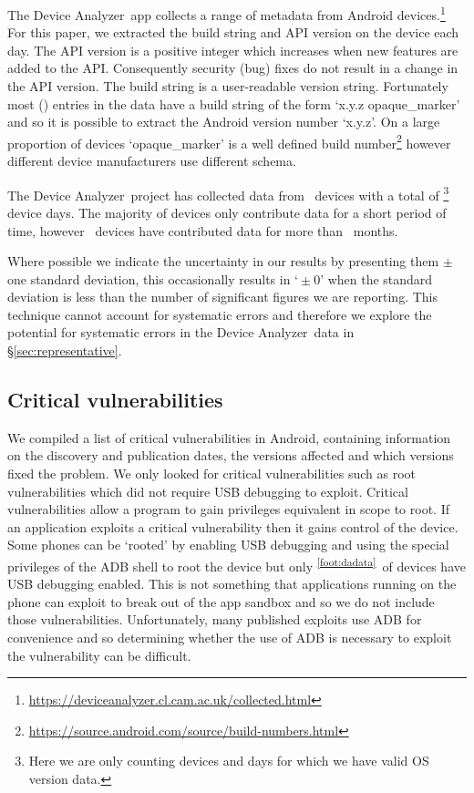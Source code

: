 \documentclass[conference,a4paper,twoside]{IEEEtran}
\newcommand{\da}{Device Analyzer}
\newcommand{\dafoot}{\textsuperscript{\ref{foot:dadata}}}
\newcommand{\daNumDevices}{\daNumOSDevices}
\newcommand{\daDeviceDays}{\daOSTotalDaysData}
\begin{document}
The \da\ app collects a range of metadata from Android devices.\footnote{\url{https://deviceanalyzer.cl.cam.ac.uk/collected.html}}
For this paper, we extracted the build string and API version on the device each day.
The API version is a positive integer which increases when new features are added to the API.
Consequently security (bug) fixes do not result in a change in the API version.
The build string is a user-readable version string.
Fortunately most (\daOSVersionPercValidLines) entries in the data have a build string of the form `x.y.z opaque\_marker' and so it is possible to extract the Android version number `x.y.z'.
On a large proportion of devices `opaque\_marker' is a well defined build number\footnote{\url{https://source.android.com/source/build-numbers.html}} however different device manufacturers use different schema.

The \da\ project has collected data from \daNumDevices\ devices with a total of \daDeviceDays\footnote{Here we are only counting devices and days for which we have valid OS version data.} device days. The majority of devices only contribute data for a short period of time, however \daMonthsDevices\ devices have contributed data for more than \daMonths~months.

Where possible we indicate the uncertainty in our results by presenting them $\pm$ one standard deviation, this occasionally results in `${} \pm 0$' when the standard deviation is less than the number of significant figures we are reporting.
This technique cannot account for systematic errors and therefore we explore the potential for systematic errors in the \da\ data in \S\ref{sec:representative}.



\subsection{Critical vulnerabilities}

We compiled a list of critical vulnerabilities in Android, containing information on the discovery and publication dates, the versions affected and which versions fixed the problem.
We only looked for critical vulnerabilities such as root vulnerabilities which did not require USB debugging to exploit.
Critical vulnerabilities allow a program to gain privileges equivalent in scope to root.
If an application exploits a critical vulnerability then it gains control of the device.
Some phones can be `rooted' by enabling USB debugging and using the special privileges of the ADB shell to root the device but only \daAdbEnabledPerc\dafoot\ of devices have USB debugging enabled.
This is not something that applications running on the phone can exploit to break out of the app sandbox and so we do not include those vulnerabilities.
Unfortunately, many published exploits use ADB for convenience and so determining whether the use of ADB is necessary to exploit the vulnerability can be difficult.
\end{document}
